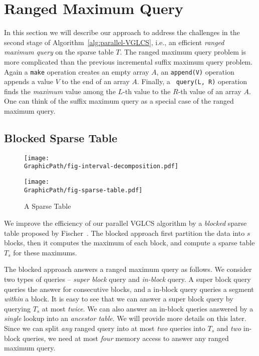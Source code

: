 \section{Ranged Maximum Query} \label{sec:parallelRMQ}

In this section we will describe our approach to address the
challenges in the second stage of Algorithm~\ref{alg:parallel-VGLCS},
i.e., an efficient {\em ranged maximum query} on the sparse table $T$.
The ranged maximum query problem is more complicated than the previous
incremental suffix maximum query problem.  Again a {\tt make}
operation creates an empty array $A$, an {\tt append(V)} operation
appends a value $V$ to the end of an array $A$.  Finally, a {\tt
  query(L, R)} operation finds the {\em maximum} value among the
$L$-th value to the $R$-th value of an array $A$.  One can think of
the suffix maximum query as a special case of the ranged maximum
query.


\subsection{Blocked Sparse Table}

\begin{figure}[!thb]   \label{fig:interval-decomposition}
  \centering 
    \texttt{[image: \\GraphicPath/fig-interval-decomposition.pdf]}

    \texttt{[image: \\GraphicPath/fig-sparse-table.pdf]}
  \caption{A Sparse Table}
\end{figure}

We improve the efficiency of our parallel VGLCS algorithm by a {\em
  blocked} sparse table proposed by
Fischer~\cite{Fischer2006TheoreticalAP}.  The blocked approach first
partition the data into $s$ blocks, then it computes the maximum of
each block, and compute a sparse table $T_s$ for these maximums.

The blocked approach answers a ranged maximum query as follows.  We
consider two types of queries -- {\em super block} query and {\em
  in-block} query.  A super block query queries the answer for
consecutive blocks, and a in-block query queries a segment {\em
  within} a block.  It is easy to see that we can answer a super block
query by querying $T_s$ at most {\em twice}.  We can also answer an
in-block queries answered by a {\em single} lookup into an {\em
  ancestor table}.  We will provide more details on this later.  Since
we can split {\em any} ranged query into at most {\em two} queries
into $T_s$ and {\em two} in-block queries, we need at most {\em four}
memory access to answer any ranged maximum query.

